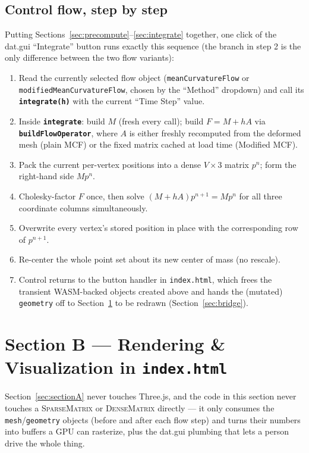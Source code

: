 \documentclass[11pt]{article}
\newcommand{\code}[1]{\texttt{#1}}
\newcommand{\func}[1]{\texttt{\textbf{#1}}}
\newcommand{\type}[1]{\textsc{#1}}
\begin{document}
\subsection{Control flow, step by step}
\label{sec:controlflow}
Putting Sections~\ref{sec:precompute}--\ref{sec:integrate} together, one click of the
dat.gui ``Integrate'' button runs exactly this sequence (the branch in step 2 is the only
difference between the two flow variants):

\begin{enumerate}[leftmargin=1.8em]
\item Read the currently selected flow object (\code{meanCurvatureFlow} or
  \code{modifiedMeanCurvatureFlow}, chosen by the ``Method'' dropdown) and call its
  \func{integrate(h)} with the current ``Time Step'' value.
\item Inside \func{integrate}: build $M$ (fresh every call); build $F=M+hA$ via
  \func{buildFlowOperator}, where $A$ is either freshly recomputed from the deformed mesh
  (plain MCF) or the fixed matrix cached at load time (Modified MCF).
\item Pack the current per-vertex positions into a dense $V\times3$ matrix $p^{n}$; form the
  right-hand side $Mp^{n}$.
\item Cholesky-factor $F$ once, then solve $(M+hA)p^{n+1}=Mp^{n}$ for all three coordinate
  columns simultaneously.
\item Overwrite every vertex's stored position in place with the corresponding row of
  $p^{n+1}$.
\item Re-center the whole point set about its new center of mass (no rescale).
\item Control returns to the button handler in \code{index.html}, which frees the
  transient WASM-backed objects created above and hands the (mutated) \code{geometry} off
  to Section~\ref{sec:sectionB} to be redrawn (Section~\ref{sec:bridge}).
\end{enumerate}

\section{Section B --- Rendering \& Visualization in \code{index.html}}
\label{sec:sectionB}

Section~\ref{sec:sectionA} never touches Three.js, and the code in this section never
touches a \type{SparseMatrix} or \type{DenseMatrix} directly --- it only consumes the
\code{mesh}/\code{geometry} objects (before and after each flow step) and turns their
numbers into buffers a GPU can rasterize, plus the dat.gui plumbing that lets a person
drive the whole thing.
\end{document}
